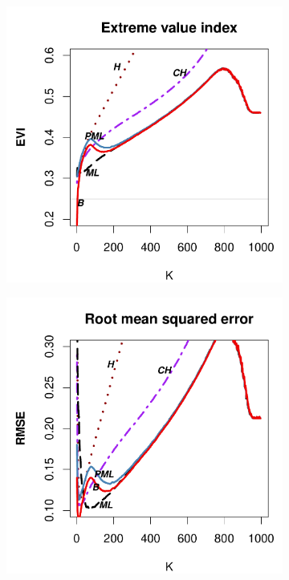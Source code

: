 \begin{figure}[h]
\begin{subfigure}[h]{0.40\linewidth}
		\end{subfigure}
		\bigskip
		\centering
		\begin{subfigure}[h]{0.40\linewidth}
			\includegraphics[width=\textwidth]{./plots/paper1/EVI_OutputGEV0,251000.pdf}
		\end{subfigure}
		\hspace{\fill}
		\begin{subfigure}[h]{0.40\linewidth}
			\includegraphics[width=\textwidth]{./plots/paper1/RMSE_OutputGEV0,251000.pdf}

\end{subfigure}
\end{figure}
